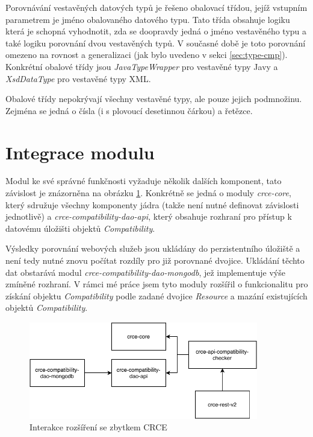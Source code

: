 \documentclass[czech,DP]{thesiskiv}
\begin{document}
Porovnávání vestavěných datových typů je řešeno obalovací třídou, jejíž vstupním parametrem je jméno obalovaného datového typu. Tato třída obsahuje logiku která je schopná vyhodnotit, zda se doopravdy jedná o jméno vestavěného typu a také logiku porovnání dvou vestavěných typů. V současné době je toto porovnání omezeno na rovnost a generalizaci (jak bylo uvedeno v sekci \ref{sec:type-cmp}). Konkrétní obalové třídy jsou \textit{JavaTypeWrapper} pro vestavěné typy Javy a \textit{XsdDataType} pro vestavěné typy XML. 

Obalové třídy nepokrývají všechny vestavěné typy, ale pouze jejich podmnožinu. Zejména se jedná o čísla (i s plovoucí desetinnou čárkou) a řetězce.

\section{Integrace modulu}

Modul ke své správné funkčnosti vyžaduje několik dalších komponent, tato závislost je znázorněna na obrázku \ref{fig:apicomp-crce-interaction}. Konkrétně se jedná o moduly \textit{crce-core}, který sdružuje všechny komponenty jádra (takže není nutné definovat závislosti jednotlivě) a \textit{crce-compatibility-dao-api}, který obsahuje rozhraní pro přístup k datovému úložišti objektů \textit{Compatibility}. 

Výsledky porovnání webových služeb jsou ukládány do perzistentního úložiště a není tedy nutné znovu počítat rozdíly pro již porovnané dvojice. Ukládání těchto dat obstarává modul \textit{crce-compatibility-dao-mongodb}, jež implementuje výše  zmíněné rozhraní. V rámci mé práce jsem tyto moduly rozšířil o funkcionalitu pro získání objektu \textit{Compatibility} podle zadané dvojice \textit{Resource} a mazání existujících objektů \textit{Compatibility}.

\begin{figure}[h]
	\centering
	\includegraphics[width=10cm]{module-integration}
	\caption{Interakce rozšíření se zbytkem CRCE}
	\label{fig:apicomp-crce-interaction}
\end{figure}
\end{document}
